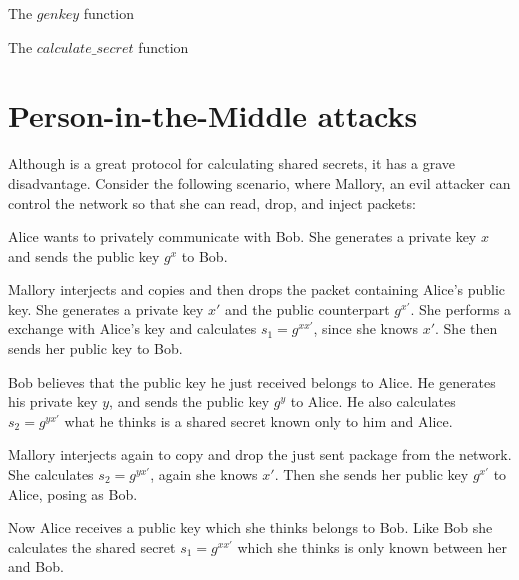 \begin{algorithm}[h]
  \caption{The $genkey$ function}
  \label{algo:dh_genkey}
\end{algorithm}

\begin{algorithm}[h]
  \caption{The $calculate\_secret$ function}
  \label{algo:dh_calculate_secret}
\end{algorithm}

\section{Person-in-the-Middle attacks}

Although \dhname is a great protocol for calculating shared secrets, it has a grave disadvantage.
Consider the following scenario, where Mallory, an evil attacker can control the network so that she can read, drop, and inject packets:

Alice wants to privately communicate with Bob. She generates a private key $x$ and sends the public key $g^x$ to Bob.

Mallory interjects and copies and then drops the packet containing Alice's public key. She generates a private key $x\prime$ and the public counterpart $g^{x\prime}$. She performs a \dhname exchange with Alice's key and calculates $s_1 = g^{xx\prime}$, since she knows $x\prime$.
She then sends her public key to Bob.

Bob believes that the public key he just received belongs to Alice. He generates his private key $y$, and sends the public key $g^y$ to Alice. He also calculates $s_2 = g^{yx\prime}$ what he thinks is a shared secret known only to him and Alice.

Mallory interjects again to copy and drop the just sent package from the network. She calculates $s_2 = g^{yx\prime}$, again she knows $x\prime$. Then she sends her public key $g^{x\prime}$ to Alice, posing as Bob.

Now Alice receives a public key which she thinks belongs to Bob. Like Bob she calculates the shared secret $s_1 = g^{xx\prime}$ which she thinks is only known between her and Bob.

